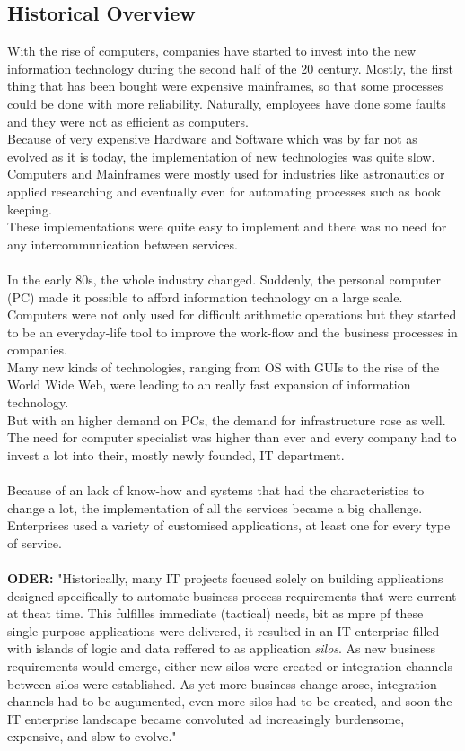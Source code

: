 \documentclass[12pt]{article}
\begin{document}
\subsection{Historical Overview}
With the rise of computers, companies have started to invest into the new information technology during the second half of the 20 century.  Mostly, the first thing that has been bought were expensive mainframes, so that some processes could be done with more reliability. Naturally, employees have done some faults and they were not as efficient as computers. \\
Because of very expensive Hardware and Software which was by far not as evolved as it is today, the implementation of new technologies was quite slow. Computers and Mainframes were mostly used for industries like astronautics or applied researching and eventually even for automating processes such as book keeping. \\ 
These implementations were quite easy to implement and there was no need for any intercommunication between services.
\\ \\
In the early 80s, the whole industry changed. Suddenly, the personal computer (PC) made it possible to afford information technology on a large scale. Computers were not only used for difficult arithmetic operations but they started to be an everyday-life tool to improve the work-flow and the business processes in companies. \\
Many new kinds of technologies, ranging from OS with GUIs to the rise of the World Wide Web, were leading to an really fast expansion of information technology. \\ 
But with an higher demand on PCs, the demand for infrastructure rose as well. The need for computer specialist was higher than ever and every company had to invest a lot into their, mostly newly founded,  IT department. \\ \\
Because of an lack of know-how and systems that had the characteristics to change a lot, the implementation of all the services became a big challenge. Enterprises used a variety of customised applications, at least one for every type of service. \\ \\
\textbf{ODER:}
"Historically, many IT projects focused solely on building applications designed specifically to automate business process requirements that were current at theat time. This fulfilles immediate (tactical) needs, bit as mpre pf these single-purpose applications were delivered, it resulted in an IT enterprise filled with islands of logic and data reffered to as application \textit{silos}. As new business requirements would emerge, either new silos were created or integration channels between silos were established. As yet more business change arose, integration channels had to be augumented, even more silos had to be created, and soon the IT enterprise landscape became convoluted ad increasingly burdensome, expensive, and slow to evolve."\cite[page 522]{grau} 
\end{document}
